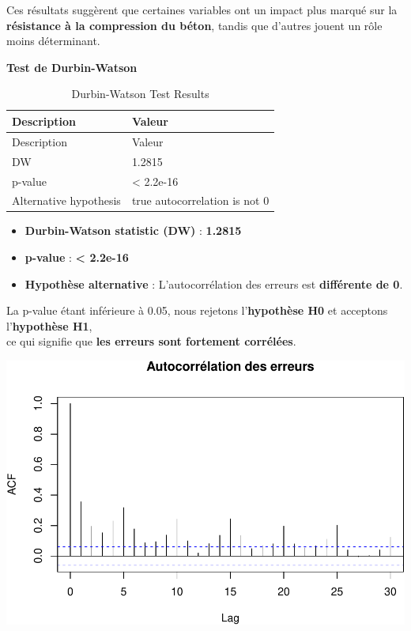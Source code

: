 \documentclass[
  12pt,
]{article}
\providecommand{\tightlist}{%
  \setlength{\itemsep}{0pt}\setlength{\parskip}{0pt}}
\begin{document}
Ces résultats suggèrent que certaines variables ont un impact plus
marqué sur la \textbf{résistance à la compression du béton}, tandis que
d'autres jouent un rôle moins déterminant.

\textbf{Test de Durbin-Watson}

\begin{longtable}[]{@{}ll@{}}
\caption{Durbin-Watson Test Results}\tabularnewline
\toprule\noalign{}
Description & Valeur \\
\midrule\noalign{}
\endfirsthead
\toprule\noalign{}
Description & Valeur \\
\midrule\noalign{}
\endhead
\bottomrule\noalign{}
\endlastfoot
DW & 1.2815 \\
p-value & \textless{} 2.2e-16 \\
Alternative hypothesis & true autocorrelation is not 0 \\
\end{longtable}

\begin{itemize}
\tightlist
\item
  \textbf{Durbin-Watson statistic (DW)} : \textbf{1.2815}\\
\item
  \textbf{p-value} : \textbf{\textless{} 2.2e-16}\\
\item
  \textbf{Hypothèse alternative} : L'autocorrélation des erreurs est
  \textbf{différente de 0}.
\end{itemize}

La p-value étant inférieure à 0.05, nous rejetons l'\textbf{hypothèse
H0} et acceptons l'\textbf{hypothèse H1},\\
ce qui signifie que \textbf{les erreurs sont fortement corrélées}.

\includegraphics{rmd_final_files/figure-latex/unnamed-chunk-21-1.pdf}
\end{document}
